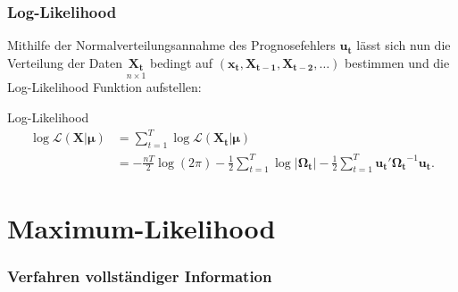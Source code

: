\documentclass{beamer} %
\begin{document}
\begin{frame}\frametitle{Log-Likelihood}
  Mithilfe der Normalverteilungsannahme des Prognosefehlers $\mathbf{u_t}$ l\"{a}sst sich nun die Verteilung der Daten $\underset{n \times 1}{\mathbf{X_t}}$ bedingt auf
$(\mathbf{x_t},\mathbf{X_{t-1}},\mathbf{X_{t-2}},\dots)$ bestimmen und die Log-Likelihood Funktion aufstellen:

\begin{block}{Log-Likelihood}
\begin{align*}
\log{ \mathcal{L}(\mathbf{X}|\boldsymbol{\mu})} &= \sum_{t=1}^T \log{\mathcal{L}(\mathbf{X_t}|\boldsymbol{\mu})}\\ &=-\frac{nT}{2} \log(2\pi) - \frac{1}{2}\sum_{t=1}^{T} \log{|\boldsymbol{\Omega_t}|}- \frac{1}{2} \sum_{t=1}^T \mathbf{u_t}' \boldsymbol{\Omega_t}^{-1} \mathbf{u_t}.
\end{align*}
\end{block}
\end{frame}

\section{Maximum-Likelihood}
\begin{frame}\frametitle{Verfahren vollst\"{a}ndiger Information}
  \tableofcontents[currentsection]
\end{frame}
\end{document}

